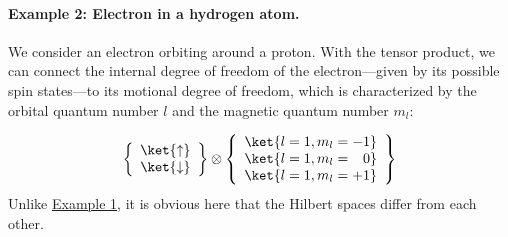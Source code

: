 				\paragraph{Example 2: Electron in a hydrogen atom.} We consider an electron orbiting around a proton. With the tensor product, we can connect the internal degree of freedom of the electron---given by its possible spin states---to its motional degree of freedom, which is characterized by the orbital quantum number $l$ and the magnetic quantum number $m_l$:

\begin{align}
						\left\{

\begin{array}
{c} \ket{\uparrow} \\ \ket{\downarrow} \end{array}
 \right\} \otimes \left\{

\begin{array}
{c} \ket{l=1,m_l=-1} \\ \ket{l=1,m_l=\enspace \; 0} \\ \ket{l=1,m_l=+1}  \end{array}
 \right\}
					
\end{align}
										Unlike \hyperref[sec:examplespin]{Example 1}, it is obvious here that the Hilbert spaces differ from each other.